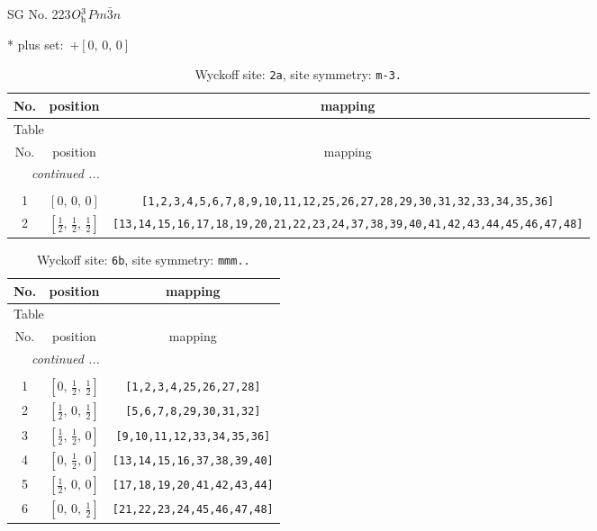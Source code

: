 \documentclass[fleqn,8pt]{jsarticle}
\begin{document}
\setcounter{MaxMatrixCols}{32}

\renewcommand{\tablename}{Table~}
\renewcommand{\figurename}{Figure~}
\begin{center}
\LARGE
SG No. 223\quad$O_{\rm h}^{3}$\quad$Pm\bar{3}n$\quad[ cubic ]
\end{center}
* plus set:\,\,\,$+\left[ 0,\, 0,\, 0 \right]$
\renewcommand{\arraystretch}{1.2}
\begin{longtable}{ccc}
\caption{Wyckoff site: {\tt 2a}, site symmetry: {\tt m-3.}}
 \\
 \hline \hline
No. & position & mapping \\ \hline \endfirsthead

\multicolumn{2}{l}{\tablename\ \thetable{}} \\
 \hline \hline
No. & position & mapping \\ \hline \endhead

 \hline \hline
\multicolumn{2}{r}{\footnotesize\it continued ...} \\ \endfoot

 \hline \hline
\multicolumn{2}{r}{} \\ \endlastfoot

1 & $\left[ 0,\, 0,\, 0 \right]$ & {\tt [1,2,3,4,5,6,7,8,9,10,11,12,25,26,27,28,29,30,31,32,33,34,35,36]} \\ \hline
2 & $\left[ \frac{1}{2},\, \frac{1}{2},\, \frac{1}{2} \right]$ & {\tt [13,14,15,16,17,18,19,20,21,22,23,24,37,38,39,40,41,42,43,44,45,46,47,48]} \\
\end{longtable}
\renewcommand{\arraystretch}{1.2}
\begin{longtable}{ccc}
\caption{Wyckoff site: {\tt 6b}, site symmetry: {\tt mmm..}}
 \\
 \hline \hline
No. & position & mapping \\ \hline \endfirsthead

\multicolumn{2}{l}{\tablename\ \thetable{}} \\
 \hline \hline
No. & position & mapping \\ \hline \endhead

 \hline \hline
\multicolumn{2}{r}{\footnotesize\it continued ...} \\ \endfoot

 \hline \hline
\multicolumn{2}{r}{} \\ \endlastfoot

1 & $\left[ 0,\, \frac{1}{2},\, \frac{1}{2} \right]$ & {\tt [1,2,3,4,25,26,27,28]} \\ \hline
2 & $\left[ \frac{1}{2},\, 0,\, \frac{1}{2} \right]$ & {\tt [5,6,7,8,29,30,31,32]} \\ \hline
3 & $\left[ \frac{1}{2},\, \frac{1}{2},\, 0 \right]$ & {\tt [9,10,11,12,33,34,35,36]} \\ \hline
4 & $\left[ 0,\, \frac{1}{2},\, 0 \right]$ & {\tt [13,14,15,16,37,38,39,40]} \\ \hline
5 & $\left[ \frac{1}{2},\, 0,\, 0 \right]$ & {\tt [17,18,19,20,41,42,43,44]} \\ \hline
6 & $\left[ 0,\, 0,\, \frac{1}{2} \right]$ & {\tt [21,22,23,24,45,46,47,48]} \\
\end{longtable}
\end{document}
